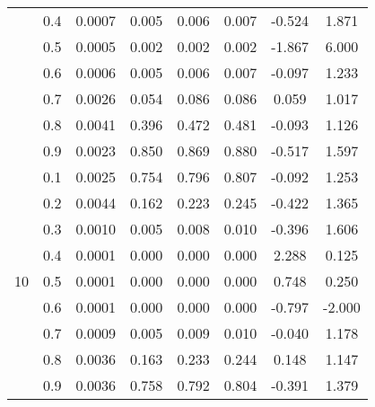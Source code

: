 \documentclass[11pt,a4paper]{report}
\begin{document}
\begin{longtable}{ | c | c || c | c | c | c | c | c | }
 & 0.4 & 0.0007 & 0.005 & 0.006 & 0.007 & -0.524 & 1.871 \\
 & 0.5 & 0.0005 & 0.002 & 0.002 & 0.002 & -1.867 & 6.000 \\
 & 0.6 & 0.0006 & 0.005 & 0.006 & 0.007 & -0.097 & 1.233 \\
 & 0.7 & 0.0026 & 0.054 & 0.086 & 0.086 & 0.059 & 1.017 \\
 & 0.8 & 0.0041 & 0.396 & 0.472 & 0.481 & -0.093 & 1.126 \\
 & 0.9 & 0.0023 & 0.850 & 0.869 & 0.880 & -0.517 & 1.597 \\
 \hline
\multirow{9}{*}{10} & 0.1 & 0.0025 & 0.754 & 0.796 & 0.807 & -0.092 & 1.253 \\
 & 0.2 & 0.0044 & 0.162 & 0.223 & 0.245 & -0.422 & 1.365 \\
 & 0.3 & 0.0010 & 0.005 & 0.008 & 0.010 & -0.396 & 1.606 \\
 & 0.4 & 0.0001 & 0.000 & 0.000 & 0.000 & 2.288 & 0.125 \\
 & 0.5 & 0.0001 & 0.000 & 0.000 & 0.000 & 0.748 & 0.250 \\
 & 0.6 & 0.0001 & 0.000 & 0.000 & 0.000 & -0.797 & -2.000 \\
 & 0.7 & 0.0009 & 0.005 & 0.009 & 0.010 & -0.040 & 1.178 \\
 & 0.8 & 0.0036 & 0.163 & 0.233 & 0.244 & 0.148 & 1.147 \\
 & 0.9 & 0.0036 & 0.758 & 0.792 & 0.804 & -0.391 & 1.379 \\
 \hline
\hline
\end{longtable}
\end{document}
